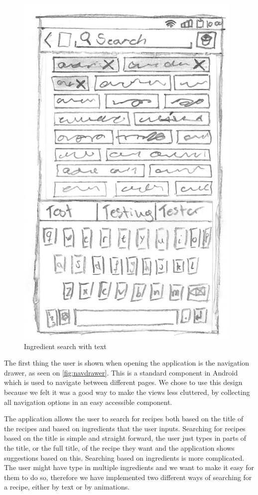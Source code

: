 \begin{figure}[H]
\begin{minipage}[b]{0.5\columnwidth}
\includegraphics[width=0.7\columnwidth]{img/prototypes/ingredient_search_text.pdf}
\caption{Ingredient search with text\label{fig:ingretext}}
\end{minipage}
\end{figure}

The first thing the user is shown when opening the application is the navigation drawer, as seen on \autoref{fig:navdrawer}. This is a standard component in Android which is used to navigate between different pages. We chose to use this design because we felt it was a good way to make the views less cluttered, by collecting all navigation options in an easy accessible component. 

The application allows the user to search for recipes both based on the title of the recipes and based on ingredients that the user inputs. Searching for recipes based on the title is simple and straight forward, the user just types in parts of the title, or the full title, of the recipe they want and the application shows suggestions based on this. Searching based on ingredients is more complicated. The user might have type in multiple ingredients and we want to make it easy for them to do so, therefore we have implemented two different ways of searching for a recipe, either by text or by animations.

